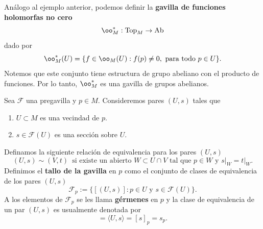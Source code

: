 \begin{example}
	Análogo al ejemplo anterior, podemos definir la \textbf{gavilla de funciones holomorfas no cero}
	\begin{equation*}
		\oo_M^*:\mathrm{Top}_M\to \mathrm{Ab}
	\end{equation*}
	dado por
	\begin{equation*}
		\oo_M^*(U)=\{f\in\oo_M(U):f(p)\neq 0,\text{ para todo }p\in U\}.
	\end{equation*}
	Notemos que este conjunto tiene estructura de grupo abeliano con el producto de funciones. Por lo tanto, $\oo_M^*$ es una gavilla de grupos abelianos.
\end{example}

    \begin{definition}
        Sea $\mathscr{F}$ una pregavilla y $p\in M$. Consideremos pares $(U,s)$ tales que
        \begin{enumerate}
            \item $U\subset M$ es una vecindad de $p$.
            \item $s\in\mathscr{F}(U)$ es una sección sobre $U$.
        \end{enumerate}
        Definamos la siguiente relación de equivalencia para los pares $(U,s)$
        \begin{equation*}
            (U,s)\sim (V,t)\enspace\text{si existe un abierto }W\subset U\cap V\text{ tal que }p\in W\text{ y }s\left.\right|_W=t\left.\right|_W.
        \end{equation*}
        Definimos el \textbf{tallo de la gavilla} en $p$ como el conjunto de clases de equivalencia de los pares $(U,s)$
        \begin{equation*}
            \mathscr{F}_p:=\{[(U,s)]:p\in U\text{ y }s\in\mathscr{F}(U)\}.
        \end{equation*}
        A los elementos de $\mathscr{F}_p$ se les llama \textbf{gérmenes} en $p$ y la clase de equivalencia de un par $(U,s)$ es usualmente denotada por  
        \begin{equation*}
            [(U,s)]=\langle U,s \rangle = [s]_p = s_p.
        \end{equation*}
    \end{definition}

